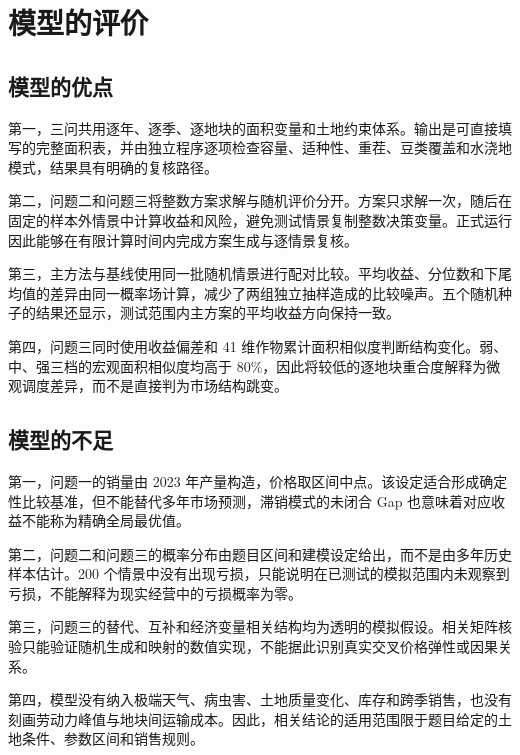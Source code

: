 \section{模型的评价}

\subsection{模型的优点}

第一，三问共用逐年、逐季、逐地块的面积变量和土地约束体系。输出是可直接填写的完整面积表，并由独立程序逐项检查容量、适种性、重茬、豆类覆盖和水浇地模式，结果具有明确的复核路径。

第二，问题二和问题三将整数方案求解与随机评价分开。方案只求解一次，随后在固定的样本外情景中计算收益和风险，避免测试情景复制整数决策变量。正式运行因此能够在有限计算时间内完成方案生成与逐情景复核。

第三，主方法与基线使用同一批随机情景进行配对比较。平均收益、分位数和下尾均值的差异由同一概率场计算，减少了两组独立抽样造成的比较噪声。五个随机种子的结果还显示，测试范围内主方案的平均收益方向保持一致。

第四，问题三同时使用收益偏差和 41 维作物累计面积相似度判断结构变化。弱、中、强三档的宏观面积相似度均高于 80\%，因此将较低的逐地块重合度解释为微观调度差异，而不是直接判为市场结构跳变。

\subsection{模型的不足}

第一，问题一的销量由 2023 年产量构造，价格取区间中点。该设定适合形成确定性比较基准，但不能替代多年市场预测，滞销模式的未闭合 Gap 也意味着对应收益不能称为精确全局最优值。

第二，问题二和问题三的概率分布由题目区间和建模设定给出，而不是由多年历史样本估计。200 个情景中没有出现亏损，只能说明在已测试的模拟范围内未观察到亏损，不能解释为现实经营中的亏损概率为零。

第三，问题三的替代、互补和经济变量相关结构均为透明的模拟假设。相关矩阵核验只能验证随机生成和映射的数值实现，不能据此识别真实交叉价格弹性或因果关系。

第四，模型没有纳入极端天气、病虫害、土地质量变化、库存和跨季销售，也没有刻画劳动力峰值与地块间运输成本。因此，相关结论的适用范围限于题目给定的土地条件、参数区间和销售规则。
